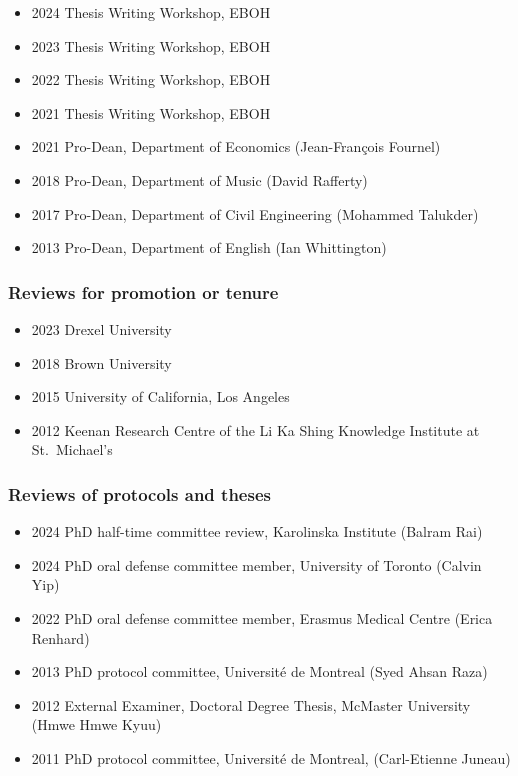 \documentclass[
  letterpaper,
  DIV=11,
  numbers=noendperiod]{scrartcl}
\providecommand{\tightlist}{%
  \setlength{\itemsep}{0pt}\setlength{\parskip}{0pt}}
\begin{document}
\begin{itemize}
\tightlist
\item
  2024 Thesis Writing Workshop, EBOH
\item
  2023 Thesis Writing Workshop, EBOH
\item
  2022 Thesis Writing Workshop, EBOH
\item
  2021 Thesis Writing Workshop, EBOH
\item
  2021 Pro-Dean, Department of Economics (Jean-François Fournel)
\item
  2018 Pro-Dean, Department of Music (David Rafferty)
\item
  2017 Pro-Dean, Department of Civil Engineering (Mohammed Talukder)
\item
  2013 Pro-Dean, Department of English (Ian Whittington)
\end{itemize}

\subsubsection{Reviews for promotion or
tenure}\label{reviews-for-promotion-or-tenure}

\begin{itemize}
\tightlist
\item
  2023 Drexel University
\item
  2018 Brown University
\item
  2015 University of California, Los Angeles
\item
  2012 Keenan Research Centre of the Li Ka Shing Knowledge Institute at
  St.~Michael's
\end{itemize}

\subsubsection{Reviews of protocols and
theses}\label{reviews-of-protocols-and-theses}

\begin{itemize}
\tightlist
\item
  2024 PhD half-time committee review, Karolinska Institute (Balram Rai)
\item
  2024 PhD oral defense committee member, University of Toronto (Calvin
  Yip)
\item
  2022 PhD oral defense committee member, Erasmus Medical Centre (Erica
  Renhard)
\item
  2013 PhD protocol committee, Université de Montreal (Syed Ahsan Raza)
\item
  2012 External Examiner, Doctoral Degree Thesis, McMaster University
  (Hmwe Hmwe Kyuu)
\item
  2011 PhD protocol committee, Université de Montreal, (Carl-Etienne
  Juneau)
\end{itemize}
\end{document}
